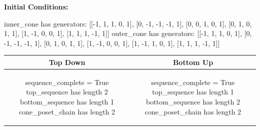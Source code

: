 \documentclass[10pt]{article}
\begin{document}
\textbf{Initial Conditions:}
\begin{SAGE}
inner_cone has generators: 
[[-1, 1, 1, 0, 1], [0, -1, -1, -1, 1], [0, 0, 1, 0, 1], [0, 1, 0, 1, 1], [1, -1, 0, 0, 1], [1, 1, 1, -1, 1]]
outer_cone has generators: 
[[-1, 1, 1, 0, 1], [0, -1, -1, -1, 1], [0, 1, 0, 1, 1], [1, -1, 0, 0, 1], [1, -1, 1, 0, 1], [1, 1, 1, -1, 1]]

\end{SAGE}
\begin{tabular}{c|c}
\textbf{Top Down} & \textbf{Bottom Up} \\ \hline  
\begin{SAGE}
sequence_complete = True
top_sequence has length 2
bottom_sequence has length 1
cone_poset_chain has length 2
\end{SAGE} 
&
\begin{SAGE}
sequence_complete = True
top_sequence has length 1
bottom_sequence has length 2
cone_poset_chain has length 2
\end{SAGE} 
\\ \hline


\end{tabular}
\end{document}
